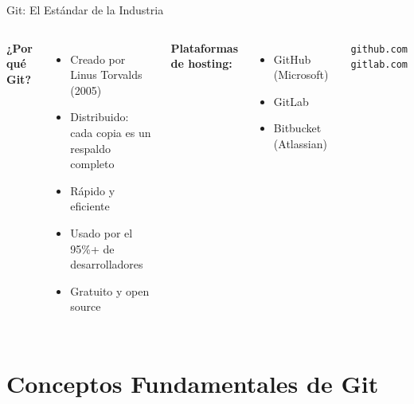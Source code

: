\documentclass[aspectratio=169]{beamer}
\begin{document}
\begin{frame}{Git: El Estándar de la Industria}
    \begin{columns}
        \textbf{¿Por qué Git?}
        \begin{itemize}
            \item Creado por Linus Torvalds (2005)
            \item Distribuido: cada copia es un respaldo completo
            \item Rápido y eficiente
            \item Usado por el 95\%+ de desarrolladores
            \item Gratuito y open source
        \end{itemize}
        
        \vspace{0.3cm}
        \textbf{Plataformas de hosting:}
        \begin{itemize}
            \item GitHub (Microsoft)
            \item GitLab
            \item Bitbucket (Atlassian)
        \end{itemize}
        
        \centering
        
        \vspace{0.5cm}
        \faGithub \ \texttt{github.com}\\
        \faGitlab \ \texttt{gitlab.com}
    \end{columns}
\end{frame}

\section{Conceptos Fundamentales de Git}
\end{document}
